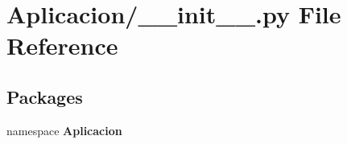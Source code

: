 \section{\-Aplicacion/\-\_\-\-\_\-init\-\_\-\-\_\-.py \-File \-Reference}
\label{_aplicacion_2____init_____8py}
\subsection*{\-Packages}
\begin{DoxyCompactItemize}
\item 
namespace {\bf \-Aplicacion}
\end{DoxyCompactItemize}
